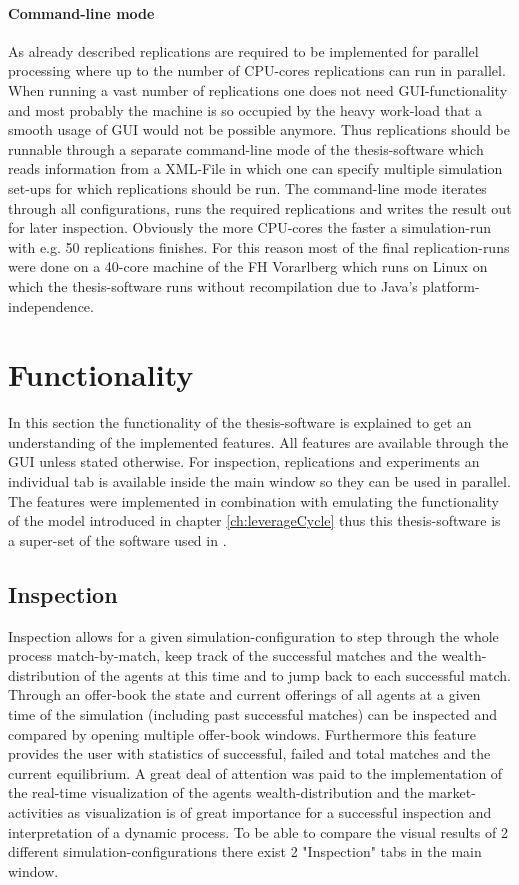 \documentclass[Bachelorarbeit.tex]{subfiles}
\begin{document}
\paragraph{Command-line mode}
As already described replications are required to be implemented for parallel processing where up to the number of CPU-cores replications can run in parallel. When running a vast number of replications one does not need GUI-functionality and most probably the machine is so occupied by the heavy work-load that a smooth usage of GUI would not be possible anymore. Thus replications should be runnable through a separate command-line mode of the thesis-software which reads information from a XML-File in which one can specify multiple simulation set-ups for which replications should be run. The command-line mode iterates through all configurations, runs the required replications and writes the result out for later inspection. Obviously the more CPU-cores the faster a simulation-run with e.g. 50 replications finishes. For this reason most of the final replication-runs were done on a 40-core machine of the FH Vorarlberg which runs on Linux on which the thesis-software runs without recompilation due to Java's platform-independence.

\section{Functionality}
In this section the functionality of the thesis-software is explained to get an understanding of the implemented features. All features are available through the GUI unless stated otherwise. For inspection, replications and experiments an individual tab is available inside the main window so they can be used in parallel. The features were implemented in combination with emulating the functionality of the model introduced in chapter \ref{ch:leverageCycle} thus this thesis-software is a super-set of the software used in \cite{Breuer2015}.

\subsection{Inspection}
Inspection allows for a given simulation-configuration to step through the whole process match-by-match, keep track of the successful matches and the wealth-distribution of the agents at this time and to jump back to each successful match. Through an offer-book the state and current offerings of all agents at a given time of the simulation (including past successful matches) can be inspected and compared by opening multiple offer-book windows. Furthermore this feature provides the user with statistics of successful, failed and total matches and the current equilibrium. A great deal of attention was paid to the implementation of the real-time visualization of the agents wealth-distribution and the market-activities as visualization is of great importance for a successful inspection and interpretation of a dynamic process. To be able to compare the visual results of 2 different simulation-configurations there exist 2 "Inspection" tabs in the main window.
\end{document}
